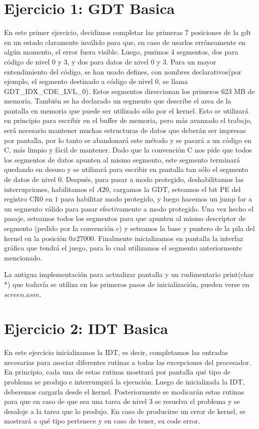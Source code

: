 \documentclass[a4paper]{article}
\begin{document}
\section{Ejercicio 1: GDT Basica}
En este primer ejercicio, decidimos completar las primeras $7$ posiciones de la gdt en un estado claramente inválido para que, en caso de usarlos erróneamente en algún momento, el error fuera visible. Luego, pusimos $4$ segmentos, dos para código de nivel 0 y 3, y dos para datos de nivel 0 y 3. Para un mayor entendimiento del código, se han usado defines, con nombres declarativos(por ejemplo, el segmento destinado a código de nivel $0$, se llama GDT_IDX_CDE_LVL_0). Estos segmentos direccionan los primeros 623 MB de memoria. También se ha declarado un segmento que describe el area de la pantalla en memoria que puede ser utilizado sólo por el kernel. Esto se utilizará en principio para escribir en el buffer de memoria, pero más avanzado el trabajo, será necesario mantener muchas estructuras de datos que deberán ser impresas por pantalla, por lo tanto se abandonará este método y se pasará a un código en C, más limpio y fácil de mantener. Dado que la convención C nos pide que todos los segmentos de datos apunten al mismo segmento, este segmento terminará quedando en desuso y se utilizará para escribir en pantalla tan sólo el segmento de datos de nivel 0. Después, para pasar a modo protegido, deshabilitamos las interrupciones, habilitamos el $A20$, cargamos la GDT, seteamos el bit PE del registro CR0 en $1$ para habilitar modo protegido, y luego hacemos un jump far a un segmento válido para pasar efectivamente a modo protegido. Una vez hecho el pasaje, seteamos todos los segmentos para que apunten al mismo descriptor de segmento (pedido por la convención c) y seteamos la base y puntero de la pila del kernel en la posición $0x27000$. Finalmente inicializamos en pantalla la interfaz gráfica que tendrá el juego, para lo cual utilizamos el segmento anteriormente mencionado.

La antigua implementación para actualizar pantalla y un rudimentario print(char *) que todavía se utiliza en los primeros pasos de inicialización, pueden verse en $screen.asm$.

%

\section{Ejercicio 2: IDT Basica} 
%

En este ejercicio inicializamos la IDT, es decir, completamos las entradas necesarias para asociar diferentes rutinas a todas las excepciones del procesador. En principio, cada una de estas rutinas mostrará por pantalla qué tipo de problema se produjo e interrumpirá la ejecución. Luego de inicializada la IDT, deberemos cargarla desde el kernel. Posteriormente se modicarán estas rutinas para que en caso de que sea una tarea de nivel 3 se resuelva el problema y se desaloje a la tarea que lo produjo.
En caso de producirse un error de kernel, se mostrará a qué tipo pertenece y en caso de tener, su code error.
\end{document}
